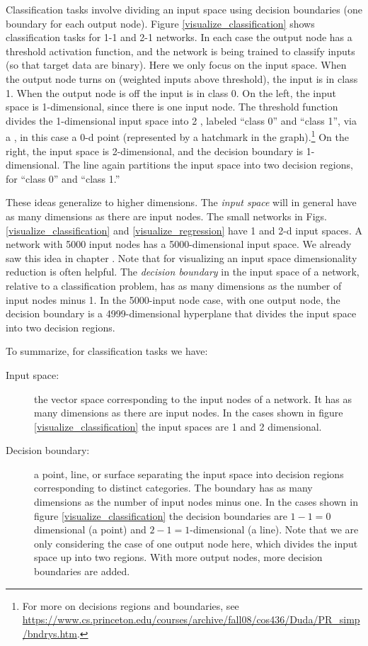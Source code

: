 Classification tasks involve dividing an input space using decision boundaries (one boundary for each output node). Figure \ref{visualize_classification} shows classification tasks for 1-1 and 2-1 networks. In each case the output node has a threshold activation function, and the network is being trained to classify inputs (so that target data are binary). Here we only focus on the input space. When the output node turns on (weighted inputs above threshold), the input is in class 1. When the output node is off the input is in class 0. On the left, the input space is 1-dimensional, since there is one input node. The threshold function divides the 1-dimensional input space into 2 ,  labeled ``class 0'' and ``class 1'', via a , in this case a 0-d point (represented by a hatchmark in the graph).\footnote{For more on decisions regions and boundaries, see \url{https://www.cs.princeton.edu/courses/archive/fall08/cos436/Duda/PR_simp/bndrys.htm}.} On the right, the input space is 2-dimensional, and the decision boundary is 1-dimensional. The line again partitions the input space into two decision regions, for ``class 0'' and ``class 1.''  

These ideas generalize to higher dimensions. The \emph{input space} will in general have as many dimensions as there are input nodes. The small networks in Figs. \ref{visualize_classification} and \ref{visualize_regression}  have 1 and 2-d input spaces. A network with 5000 input nodes has a 5000-dimensional input space. We already saw this idea in chapter . Note that for visualizing an input space dimensionality reduction is often helpful. The \emph{decision boundary} in the input space of a network, relative to a classification problem, has as many dimensions as the number of input nodes minus 1. In the 5000-input node case, with one output node, the decision boundary is a 4999-dimensional hyperplane that divides the input space into two decision regions.

To summarize, for classification tasks we have:
\begin{description}
\item[Input space:] the vector space corresponding to the input nodes of a network. It has as many dimensions as there are input nodes. In the cases shown in figure \ref{visualize_classification} the input spaces are 1 and 2 dimensional.
\item[Decision boundary:] a point, line, or surface separating the input space into decision regions corresponding to distinct categories. The boundary has as many dimensions as the number of input nodes minus one. In the cases shown in figure \ref{visualize_classification} the decision boundaries are $1-1=0$ dimensional (a point) and $2-1=1$-dimensional (a line). Note that we are only considering the case of one output node here, which divides the input space up into two regions. With more output nodes, more decision boundaries are added.
\end{description}
		
